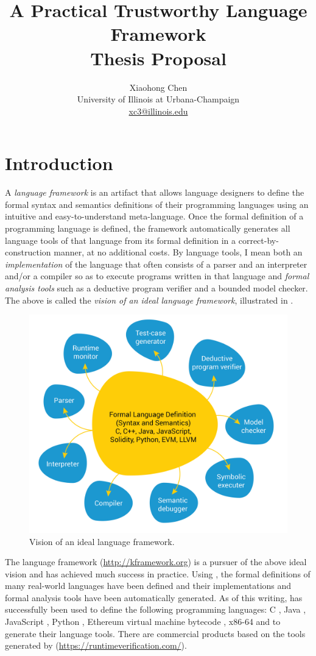 \documentclass[11pt]{article}
\title{A Practical Trustworthy Language Framework\\ \large Thesis 
Proposal}
\author{Xiaohong Chen \\ University of Illinois at Urbana-Champaign \\ 
\url{xc3@illinois.edu}}
\date{}
\begin{document}
\maketitle

\tableofcontents

\section{Introduction}

A \emph{language framework} is an artifact that allows language designers to 
define the formal syntax and semantics definitions of their programming 
languages using an intuitive and easy-to-understand meta-language. 
Once the formal definition of a programming language is defined,
the framework automatically generates all language tools of that language from 
its formal definition in a correct-by-construction manner, at no additional 
costs. 
By language tools, I mean both an \emph{implementation} of the language
that often consists of a parser and an interpreter and/or a compiler
so as to execute programs written in that language
and \emph{formal analysis tools} such as a deductive program verifier
and a bounded model checker. 
The above is called the \emph{vision of an ideal language framework},
illustrated in . 

\begin{figure}
\centering
\includegraphics[width=0.6\columnwidth]{figs/k-vision.png}
\caption{Vision of an ideal language framework.}
\label{fig:ideal}
\end{figure}

The \K language framework (\url{http://kframework.org}) is a pursuer of the 
above ideal vision and has achieved much success in practice.
Using \K, the formal definitions of many real-world languages
have been defined and their implementations and formal analysis tools have been 
automatically generated. 
As of this writing, \K has successfully been used to define the following 
programming languages:
C \cite{HER15},
Java \cite{BR15},
JavaScript \cite{PSR15},
Python \cite{Gut13},
Ethereum virtual machine bytecode \cite{HSZ+18},
x86-64 \cite{DPK+19}
and to generate their language tools. 
There are commercial products based on the tools generated by \K
(\url{https://runtimeverification.com/}). 
\end{document}
